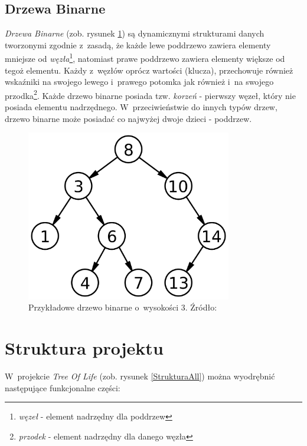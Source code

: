 \documentclass[12pt,a4paper,oneside]{book}
\theoremstyle{definition}
\numberwithin{equation}{chapter}
\begin{document}
\subsection{Drzewa Binarne}
\par \textit{Drzewa Binarne} (zob. rysunek \ref{BinaryTree}) są dynamicznymi strukturami danych tworzonymi zgodnie z~zasadą, że każde lewe poddrzewo zawiera elementy mniejsze od \textit{węzła}\footnote{\textit{węzeł} - element nadrzędny dla poddrzew}, natomiast prawe poddrzewo zawiera elementy większe od tegoż elementu. Każdy z~węzłów oprócz wartości (klucza), przechowuje również wskaźniki na swojego lewego i~prawego potomka jak również i~na swojego przodka\footnote{\textit{przodek} - element nadrzędny dla danego węzła}. Każde drzewo binarne posiada tzw. \textit{korzeń} - pierwszy węzeł, który nie posiada elementu nadrzędnego. W~przeciwieństwie do innych typów drzew, drzewo binarne może posiadać co najwyżej dwoje dzieci - poddrzew. 
\begin{figure}[hpt!]
        \centering
        \includegraphics[width=0.8\textwidth]{images/Binary_search_tree.svg.png}
        \caption{Przykładowe drzewo binarne o~wysokości 3. Źródło: \cite{BinaryTree}}
        \label{BinaryTree}
\end{figure}
\section{Struktura projektu}
\par W~projekcie \textit{Tree Of Life} (zob. rysunek \ref{StrukturaAll}) można wyodrębnić następujące funkcjonalne części:
\end{document}
